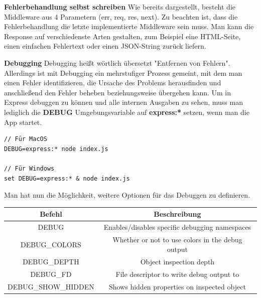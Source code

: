 \textbf{Fehlerbehandlung selbst schreiben}
\newline
Wie bereits dargestellt, besteht die Middleware aus 4 Parametern (err, req, res, next). Zu beachten ist, dass die Fehlerbehandlung die letzte implementierte Middleware sein muss. Man kann die Response auf verschiedenste Arten gestalten, zum Beispiel eine HTML-Seite, einen einfachen Fehlertext oder einen JSON-String zurück liefern.
\cite{express_js_error_handling}

\textbf{Debugging}
\newline
Debugging heißt wörtlich übersetzt "Entfernen von Fehlern". Allerdings ist mit Debugging ein mehrstufiger Prozess gemeint, mit dem man einen Fehler identifizieren, die Ursache des Problems herausfinden und anschließend den Fehler beheben beziehungsweise übergehen kann.
\cite{debugging_allgemein}
\newline
Um in Express debuggen zu können und alle internen Ausgaben zu sehen, muss man lediglich die \textbf{DEBUG} Umgebungsvariable auf \textbf{express:*} setzen, wenn man die App startet.
\begin{verbatim}
// Für MacOS
DEBUG=express:* node index.js

// Für Windows
set DEBUG=express:* & node index.js
\end{verbatim}
Man hat nun die Möglichkeit, weitere Optionen für das Debuggen zu definieren.
\begin{center}
    \begin{tabular}{||c c||} 
        \hline
        Befehl & Beschreibung \\ [0.5ex] 
        \hline\hline
        DEBUG & Enables/disables specific debugging namespaces \\ 
        \hline
        DEBUG\_COLORS & Whether or not to use colors in the debug output \\
        \hline
        DEBUG\_DEPTH & Object inspection depth \\
        \hline
        DEBUG\_FD & File descriptor to write debug output to \\
        \hline
        DEBUG\_SHOW\_HIDDEN & Shows hidden properties on inspected object \\ [1ex] 
        \hline
    \end{tabular}
\end{center}
\cite{Express_js_third_party_middlewares}

